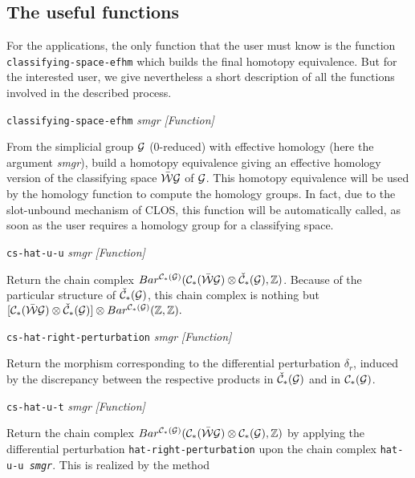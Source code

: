 \subsection {The useful functions}

For the applications, the only function that the user must know is the function {\tt classifying-space-efhm}
which builds the final homotopy equivalence. But for the
interested user, we give nevertheless a short description of all the functions
involved in the described process.

\vskip 0.30cm
{\parindent=0mm
{\leftskip=5mm
{\tt classifying-space-efhm} {\em smgr}  \hfill {\em [Function]} \par}
{\leftskip=15mm
From the simplicial group ${\cal G}$ ($0$-reduced) with effective homology (here the argument {\em smgr}), build
a homotopy equivalence giving an effective homology version  of the classifying space $\bar{\cal W}{\cal G}$ of ${\cal G}$. 
This homotopy
equivalence will be used by the homology function to compute the homology groups. In fact, due to
the slot-unbound mechanism of CLOS, this function will be automatically called, as soon
as the user requires a homology group for a classifying space. \par}
{\leftskip=5mm
{\tt cs-hat-u-u} {\em smgr}  \hfill {\em [Function]} \par}
{\leftskip=15mm
Return the chain complex 
$Bar^{{\cal C}_*({\cal G})}({\cal C}_*(\bar{\cal W}{\cal G})\otimes {\check{\cal C}}_*({\cal G}),{{\Bbb Z}})$. Because of
the particular structure of ${\check{\cal C}}_*({\cal G})$, this chain complex is nothing but
$[{\cal C}_*(\bar{\cal W}{\cal G})\otimes {\check{\cal C}}_*({\cal G})]\otimes Bar^{{\cal C}_*({\cal G})}({{\Bbb Z}},{{\Bbb Z}}).$
\par}
{\leftskip=5mm
{\tt cs-hat-right-perturbation} {\em smgr}  \hfill {\em [Function]} \par}
{\leftskip=15mm
Return the morphism corresponding to the differential perturbation $\delta_r$, induced by
the discrepancy between the respective products in  ${\check{\cal C}}_*({\cal G})$ and 
in ${\cal C}_*({\cal G})$. \par}
{\leftskip=5mm
{\tt cs-hat-u-t} {\em smgr}  \hfill {\em [Function]} \par}
{\leftskip=15mm
Return the chain complex
$Bar^{{\cal C}_*({\cal G})}({\cal C}_*(\bar{\cal W}{\cal G})\otimes {\cal C}_*({\cal G}),{{\Bbb Z}})$ by applying
the differential perturbation {\tt hat-right-perturbation} upon
the chain complex {\tt hat-u-u {\em smgr}}. This is realized by the method
}}
